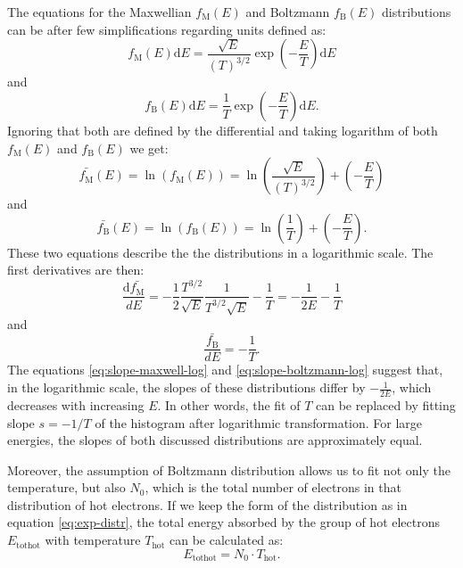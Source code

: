 The equations for the Maxwellian $f_\mathrm{M}(E)$ and Boltzmann $f_\mathrm{B}(E)$ distributions can be after few simplifications regarding units defined as:
\begin{equation}
	f_\mathrm{M}(E)\mathrm{d}E = \frac{\sqrt{E}}{(T)^{3/2}}\exp\left(-\frac{E}{T}\right)\mathrm{d}E
\end{equation}
and
\begin{equation}
	f_\mathrm{B}(E)\mathrm{d}E = \frac{1}{T}\exp\left(-\frac{E}{T}\right)\mathrm{d}E.
\end{equation}
Ignoring that both are defined by the differential and taking logarithm of both $f_\mathrm{M}(E)$ and $f_\mathrm{B}(E)$ we get:
\begin{equation}
	\bar{f_\mathrm{M}}(E) = \ln\left(f_\mathrm{M}(E)\right) = \ln\left(\frac{\sqrt{E}}{(T)^{3/2}}\right)+\left(-\frac{E}{T}\right)
\end{equation}
and
\begin{equation}
	\bar{f_\mathrm{B}}(E) = \ln\left(f_\mathrm{B}(E)\right) = \ln\left(\frac{1}{T}\right)+\left(-\frac{E}{T}\right).
\end{equation}
These two equations describe the the distributions in a logarithmic scale. The first derivatives are then:
\begin{equation}
	\label{eq:slope-maxwell-log}
	\frac{\mathrm{d}\bar{f_\mathrm{M}}}{dE} =-\frac{1}{2}\frac{T^{3/2}}{\sqrt{E}}\frac{1}{T^{3/2}\sqrt{E}}-\frac{1}{T} = -\frac{1}{2E}-\frac{1}{T}
\end{equation}
and
\begin{equation}
	\label{eq:slope-boltzmann-log}
	\frac{\bar{f_\mathrm{B}}}{dE} = -\frac{1}{T}.
\end{equation}
The equations \ref{eq:slope-maxwell-log} and \ref{eq:slope-boltzmann-log} suggest that, in the logarithmic scale, the slopes of these distributions differ by $-\frac{1}{2E}$, which decreases with increasing $E$. In other words, the fit of $T$ can be replaced by fitting slope $s = -1/T$ of the histogram after logarithmic transformation. For large energies, the slopes of both discussed distributions are approximately equal. 

Moreover, the assumption of Boltzmann distribution allows us to fit not only the temperature, but also $N_0$, which is the total number of electrons in that distribution of hot electrons. If we keep the form of the distribution as in equation \ref{eq:exp-distr}, the total energy absorbed by the group of hot electrons $E_{\mathrm{tothot}}$ with temperature $T_\mathrm{hot}$ can be calculated as:
\begin{equation}
	E_{\mathrm{tothot}} = N_0\cdot T_\mathrm{hot}.
\end{equation}


